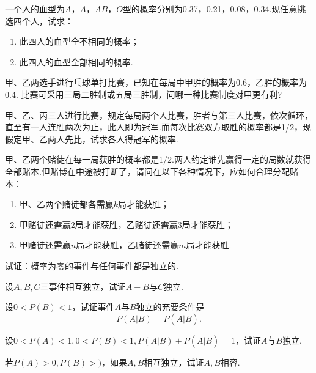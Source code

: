 \begin{xiti}
  \item 一个人的血型为$A$，$A$，$AB$，$O$型的概率分别为0.37，0.21，0.08，0.34.现任意挑选四个人，试求：
      \begin{enumerate}
        \item 此四人的血型全不相同的概率；
        \item 此四人的血型全部相同的概率.
      \end{enumerate}

  \item 甲、乙两选手进行乓球单打比赛，已知在每局中甲胜的概率为0.6，乙胜的概率为0.4. 比赛可采用三局二胜制或五局三胜制，问哪一种比赛制度对甲更有利?

  \item 甲、乙、丙三人进行比赛，规定每局两个人比赛，胜者与第三人比赛，依次循环，直至有一人连胜两次为止，此人即为冠军.而每次比赛双方取胜的概率都是1/2，现假定甲、乙两人先比，试求各人得冠军的概率.

  \item 甲、乙两个赌徒在每一局获胜的概率都是1/2.两人约定谁先赢得一定的局数就获得全部赌本.但赌博在中途被打断了，请问在以下各种情况下，应如何合理分配赌本：
      \begin{enumerate}
        \item 甲、乙两个赌徒都各需赢$k$局才能获胜；
        \item 甲赌徒还需赢2局才能获胜，乙赌徒还需赢3局才能获胜；
        \item 甲赌徒还需赢$n$局才能获胜，乙赌徒还需赢$m$局才能获胜.
      \end{enumerate}

  \item 试证：概率为零的事件与任何事件都是独立的.

  \item 设$A,B,C$三事件相互独立，试证$A-B$与$C$独立.

  \item 设$0<P(B)<1$，试证事件$A$与$B$独立的充要条件是
  \[
    P(A|B) = P(A|\bar B).
  \]

  \item 设$0<P(A)<1,0<P(B)<1,P(A|B)+P(\bar A|\bar B)=1$，试证$A$与$B$独立.

  \item 若$P(A)>0,P(B)>)$，如果$A,B$相互独立，试证$A,B$相容.
\end{xiti} 
